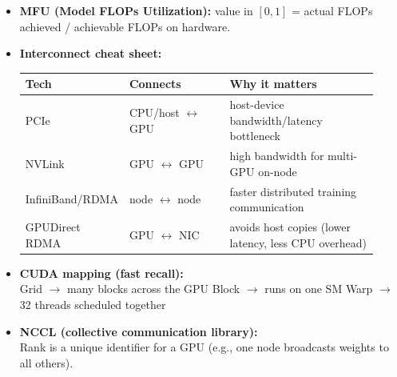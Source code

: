 \documentclass[11pt]{article}
\newcommand{\blue}[1]{\textcolor{myblue}{#1}}
\newcommand{\term}[1]{\textbf{\blue{#1}}}
\begin{document}
\begin{itemize}[leftmargin=1.2em]
    \item \term{MFU (Model FLOPs Utilization):} value in $[0,1]$ = actual FLOPs achieved / achievable FLOPs on hardware.
    
    \item \term{Interconnect cheat sheet:}
    \begin{center}
    \renewcommand{\arraystretch}{1.15}
    \begin{tabular}{|p{0.18\linewidth}|p{0.30\linewidth}|p{0.44\linewidth}|}
    \hline
    \textbf{Tech} & \textbf{Connects} & \textbf{Why it matters} \\
    \hline
    PCIe & CPU/host $\leftrightarrow$ GPU & host-device bandwidth/latency bottleneck \\
    \hline
    NVLink & GPU $\leftrightarrow$ GPU & high bandwidth for multi-GPU on-node \\
    \hline
    InfiniBand/RDMA & node $\leftrightarrow$ node & faster distributed training communication \\
    \hline
    GPUDirect RDMA & GPU $\leftrightarrow$ NIC & avoids host copies (lower latency, less CPU overhead) \\
    \hline
    \end{tabular}
    \end{center}
    
    \item \term{CUDA mapping (fast recall):}\\
    Grid $\rightarrow$ many blocks across the GPU \quad
    Block $\rightarrow$ runs on one SM \quad
    Warp $\rightarrow$ 32 threads scheduled together
    
    \item \term{NCCL (collective communication library):}\\
    Rank is a unique identifier for a GPU (e.g., one node broadcasts weights to all others).
    

\end{itemize}
\end{document}
